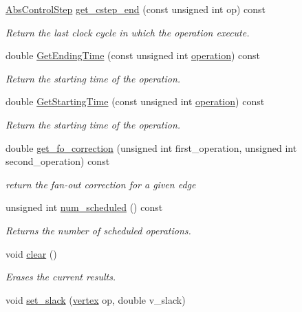 \begin{DoxyCompactItemize}
\hyperlink{structAbsControlStep}{Abs\+Control\+Step} \hyperlink{classSchedule_aadafc63bf5654bb1fe471923c7f7f763}{get\+\_\+cstep\+\_\+end} (const unsigned int op) const
\begin{DoxyCompactList}\small\item\em Return the last clock cycle in which the operation execute. \end{DoxyCompactList}\item 
double \hyperlink{classSchedule_a964e824c93e67dae2f72137c8a6f2a05}{Get\+Ending\+Time} (const unsigned int \hyperlink{structoperation}{operation}) const
\begin{DoxyCompactList}\small\item\em Return the starting time of the operation. \end{DoxyCompactList}\item 
double \hyperlink{classSchedule_ac2e233f2734b8d91805a4a51e3bd3246}{Get\+Starting\+Time} (const unsigned int \hyperlink{structoperation}{operation}) const
\begin{DoxyCompactList}\small\item\em Return the starting time of the operation. \end{DoxyCompactList}\item 
double \hyperlink{classSchedule_a3c418e4bcd41ae0e8b88c117d377f227}{get\+\_\+fo\+\_\+correction} (unsigned int first\+\_\+operation, unsigned int second\+\_\+operation) const
\begin{DoxyCompactList}\small\item\em return the fan-\/out correction for a given edge \end{DoxyCompactList}\item 
unsigned int \hyperlink{classSchedule_a93bef5f10d60f02ab62a87bf65a5ae70}{num\+\_\+scheduled} () const
\begin{DoxyCompactList}\small\item\em Returns the number of scheduled operations. \end{DoxyCompactList}\item 
void \hyperlink{classSchedule_aa94b33ccedaa82177f6a78b3fe646446}{clear} ()
\begin{DoxyCompactList}\small\item\em Erases the current results. \end{DoxyCompactList}\item 
void \hyperlink{classSchedule_af9a710c306cf7d06428bc10da109d4ee}{set\+\_\+slack} (\hyperlink{graph_8hpp_abefdcf0544e601805af44eca032cca14}{vertex} op, double v\+\_\+slack)

\end{DoxyCompactItemize}
